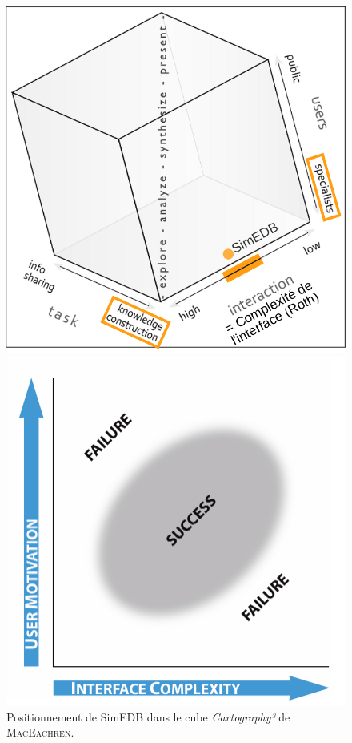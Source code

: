 \begin{figure}[H]
	\hspace*{\fill}%
	\begin{minipage}[t]{.46\linewidth}
		\centering
		\captionsetup{width=.9\linewidth}
		\vspace{0pt}
		\includegraphics[width=\linewidth]{img/Cartography3_SimEDB.pdf}
		\caption{Positionnement de SimEDB dans le cube \textit{Cartography³} de \textsc{MacEachren}.}
		\label{fig:cartography3-simedb}
	\end{minipage} \hfill
	\begin{minipage}[t]{.46\linewidth}
		\centering
		\captionsetup{width=.9\linewidth}
		\vspace{0pt}
		\includegraphics[width=\linewidth]{img/Roth_Interface_Complexity.png}

\end{minipage}
\end{figure}
